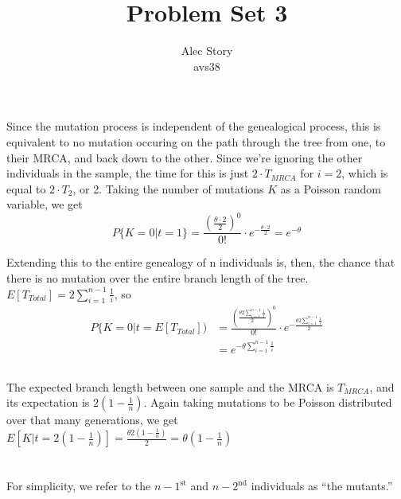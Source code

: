 \documentclass{article}
\title{Problem Set 3}
\author{Alec Story \\ \small{avs38}}
\begin{document}
\maketitle

\section{}
\subsection{}
Since the mutation process is independent of the genealogical process, this is
equivalent to no mutation occuring on the path through the tree from one, to
their MRCA, and back down to the other.  Since we're ignoring the other
individuals in the sample, the time for this is just $2 \cdot T_{MRCA}$ for
$i=2$, which is equal to $2 \cdot T_2$, or 2.  Taking the number of mutations
$K$ as a Poisson random variable, we get
$$P\{K=0 | t=1\} = \frac{(\frac{\theta \cdot 2}{2})^0}{0!} \cdot
                   e^{-\frac{\theta \cdot 2}{2}}
                 = e ^{-\theta}$$

Extending this to the entire genealogy of n individuals is, then, the chance
that there is no mutation over the entire branch length of the tree.
$E[T_{Total}] = 2 \sum_{i=1}^{n-1} \frac{1}{i}$, so
\begin{align*}
 P\{K=0 | t = E[T_{Total}]) &= \frac{(\frac{
                               \theta 2 \sum_{i=1}^{n-1} \frac{1}{i}}{2})^0}{0!}
                               \cdot
                               e^{-\frac{
                               \theta 2 \sum_{i=1}^{n-1} \frac{1}{i}}{2}} \\
                            &= e^{-\theta \sum_{i=1}^{n-1} \frac{1}{i}}
\end{align*}
\subsection{}
The expected branch length between one sample and the MRCA is $T_{MRCA}$, and
its expectation is $2(1-\frac{1}{n})$.  Again taking mutations to be Poisson
distributed over that many generations, we get $E[K|t=2(1-\frac{1}{n})] =
\frac{\theta 2(1-\frac{1}{n})}{2} = \theta (1-\frac{1}{n})$
\section{}
For simplicity, we refer to the $n-1^\textrm{st}$ and $n-2^\textrm{nd}$
individuals as ``the mutants.''
\end{document}

